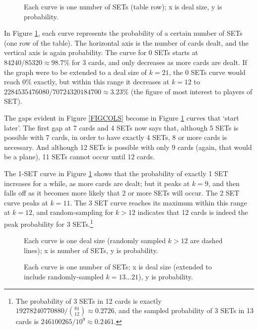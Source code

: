 \documentclass[10pt]{amsart}
\newcommand{\SET}{SET\texttrademark}  %
\begin{document}
\begin{figure}[!htb]
  \caption{\label{FIGROWS} Each curve is one number of SETs (table row); x is
    deal size, y is probability.}
\end{figure}

In Figure \ref{FIGROWS}, each curve represents the probability of a certain
number of SETs (one row of the table). The horizontal axis is the number of
cards dealt, and the vertical axis is again probability. The curve for 0 SETs starts
at $84240/85320\approx 98.7\%$ for 3 cards, and only decreases as more cards are
dealt. If the graph were to be extended to a deal size of $k=21$, the 0 SETs
curve would reach $0\%$ exactly, but within this range it decreases at $k=12$ to
$2284535476080/70724320184700\approx 3.23\%$ (the figure of most interest to
players of \SET).

The gaps evident in Figure \ref{FIGCOLS} become in Figure \ref{FIGROWS} curves
that `start later'. The first gap at 7 cards and 4 SETs now says that, although
5 SETs is possible with 7 cards, in order to have exactly 4 SETs, 8 or more
cards is necessary. And although 12 SETs is possible with only 9 cards (again,
that would be a plane), 11 SETs cannot occur until 12 cards.

The 1-SET curve in Figure \ref{FIGROWS} shows that the probability of exactly 1
SET increases for a while, as more cards are dealt; but it peaks at $k=9$, and
then falls off as it becomes more likely that 2 or more SETs will occur. The 2
SET curve peaks at $k=11$. The 3 SET curve reaches its maximum within this range
at $k=12$, and random-sampling for $k>12$ indicates that 12 cards is indeed the
peak probability for 3 SETs.\footnote{The probability of 3 SETs in 12 cards is
  exactly $19278240770880/\binom{81}{12}\approx 0.2726$, and the sampled
  probability of 3 SETs in 13 cards is $246100265/10^9\approx 0.2461$.}

\begin{figure}[!htb]
  \caption{\label{FIGCOLSFULL} Each curve is one deal size (randomly sampled $k>12$
    are dashed lines); x is number of SETs, y is probability.}
\end{figure}

\begin{figure}[!htb]
  \caption{\label{FIGROWSFULL} Each curve is one number of SETs; x is deal size
    (extended to include randomly-sampled $k=13\ldots 21$), y is probability.}
\end{figure}
\end{document}
